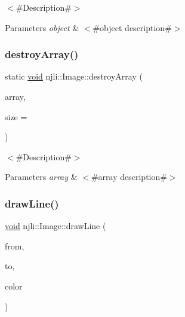 $<$\#\+Description\#$>$


\begin{DoxyParams}{Parameters}
{\em object} & $<$\#object description\#$>$ \\
\hline
\end{DoxyParams}
\mbox{\label{classnjli_1_1_image_ab90237b3d43d565d2e06763b53ccf339}} 
\subsubsection{\texorpdfstring{destroy\+Array()}{destroyArray()}}
{\footnotesize\ttfamily static \mbox{\hyperlink{_thread_8h_af1e856da2e658414cb2456cb6f7ebc66}{void}} njli\+::\+Image\+::destroy\+Array (\begin{DoxyParamCaption}\item[{\mbox{\hyperlink{classnjli_1_1_image}{Image}} $\ast$$\ast$}]{array,  }\item[{const \mbox{\hyperlink{_util_8h_a10e94b422ef0c20dcdec20d31a1f5049}{u32}}}]{size = {} }\end{DoxyParamCaption})\hspace{0.3cm}{\ttfamily [static]}}

$<$\#\+Description\#$>$


\begin{DoxyParams}{Parameters}
{\em array} & $<$\#array description\#$>$ \\
\hline
\end{DoxyParams}
\mbox{\label{classnjli_1_1_image_a1e15b3f6496df2fd30343d8b1d3953a6}} 
\subsubsection{\texorpdfstring{draw\+Line()}{drawLine()}\hspace{0.1cm}{\footnotesize\ttfamily [1/2]}}
{\footnotesize\ttfamily \mbox{\hyperlink{_thread_8h_af1e856da2e658414cb2456cb6f7ebc66}{void}} njli\+::\+Image\+::draw\+Line (\begin{DoxyParamCaption}\item[{const bt\+Vector2 \&}]{from,  }\item[{const bt\+Vector2 \&}]{to,  }\item[{const bt\+Vector4 \&}]{color }\end{DoxyParamCaption})}

